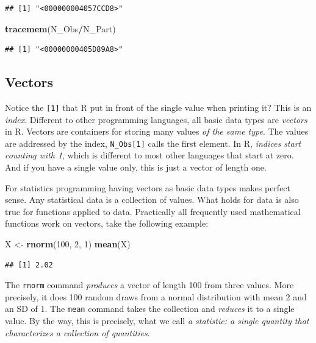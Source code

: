\documentclass[]{svmono}
\newenvironment{Shaded}{\begin{snugshade}}{\end{snugshade}}
\newcommand{\KeywordTok}[1]{\textcolor[rgb]{0.13,0.29,0.53}{\textbf{#1}}}
\newcommand{\DecValTok}[1]{\textcolor[rgb]{0.00,0.00,0.81}{#1}}
\newcommand{\StringTok}[1]{\textcolor[rgb]{0.31,0.60,0.02}{#1}}
\newcommand{\OperatorTok}[1]{\textcolor[rgb]{0.81,0.36,0.00}{\textbf{#1}}}
\newcommand{\NormalTok}[1]{#1}
\theoremstyle{definition}
\theoremstyle{definition}
\theoremstyle{definition}
\theoremstyle{remark}
\begin{document}
\begin{verbatim}
## [1] "<000000004057CCD8>"
\end{verbatim}

\begin{Shaded}
\begin{Highlighting}[]
\KeywordTok{tracemem}\NormalTok{(N_Obs}\OperatorTok{/}\NormalTok{N_Part)}
\end{Highlighting}
\end{Shaded}

\begin{verbatim}
## [1] "<00000000405D89A8>"
\end{verbatim}

\subsection{Vectors}\label{vectors}

Notice the \texttt{{[}1{]}} that R put in front of the single value when
printing it? This is an \emph{index}. Different to other programming
languages, all basic data types are \emph{vectors} in R. Vectors are
containers for storing many values \emph{of the same type}. The values
are addressed by the index, \texttt{N\_Obs{[}1{]}} calls the first
element. In R, \emph{indices start counting with 1}, which is different
to most other languages that start at zero. And if you have a single
value only, this is just a vector of length one.

For statistics programming having vectors as basic data types makes
perfect sense. Any statistical data is a collection of values. What
holds for data is also true for functions applied to data. Practically
all frequently used mathematical functions work on vectors, take the
following example:

\begin{Shaded}
\begin{Highlighting}[]
\NormalTok{X <-}\StringTok{ }\KeywordTok{rnorm}\NormalTok{(}\DecValTok{100}\NormalTok{, }\DecValTok{2}\NormalTok{, }\DecValTok{1}\NormalTok{)}
\KeywordTok{mean}\NormalTok{(X)}
\end{Highlighting}
\end{Shaded}

\begin{verbatim}
## [1] 2.02
\end{verbatim}

The \texttt{rnorm} command \emph{produces} a vector of length 100 from
three values. More precisely, it does 100 random draws from a normal
distribution with mean 2 and an SD of 1. The \texttt{mean} command takes
the collection and \emph{reduces} it to a single value. By the way, this
is precisely, what we call \emph{a statistic: a single quantity that
characterizes a collection of quantities}.
\end{document}
